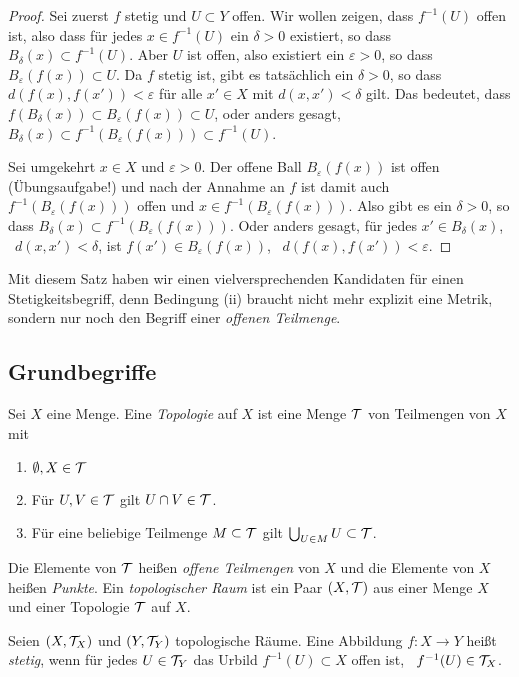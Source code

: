 \begin{proof}
Sei zuerst $f$ stetig und $U\subset Y$ offen. Wir wollen zeigen, dass
$f^{-1}(U)$ offen ist, also dass für jedes $x\in f^{-1}(U)$ ein $\delta>0$
existiert, so dass $B_\delta(x)\subset f^{-1}(U)$. Aber $U$ ist offen, also
existiert ein $\varepsilon>0$, so dass $B_\varepsilon(f(x))\subset U$. Da $f$
stetig ist, gibt es tatsächlich ein $\delta > 0$, so dass $d(f(x),f(x')) <
\varepsilon$ für alle $x'\in X$ mit $d(x,x')<\delta$ gilt. Das bedeutet, dass $f(B_\delta(x))\subset B_\varepsilon(f(x))\subset U$,
oder anders gesagt, $B_\delta(x)\subset f^{-1}(B_\varepsilon(f(x)))\subset
f^{-1}(U)$.

Sei umgekehrt $x\in X$ und $\varepsilon>0$. Der offene Ball
$B_\varepsilon(f(x))$ ist offen (Übungsaufgabe!) und nach der Annahme an $f$ ist
damit auch $f^{-1}(B_\varepsilon(f(x)))$ offen und $x\in
f^{-1}(B_\varepsilon(f(x)))$. Also gibt es ein $\delta>0$, so dass
$B_\delta(x)\subset f^{-1}(B_\varepsilon(f(x)))$. Oder anders gesagt, für jedes
$x'\in B_\delta(x)$, \ddh~$d(x,x')<\delta$, ist $f(x')\in B_\varepsilon(f(x))$,
\ddh~$d(f(x),f(x')) < \varepsilon$.
\end{proof}
Mit diesem Satz haben wir einen vielversprechenden Kandidaten für einen
Stetigkeitsbegriff, denn Bedingung (ii) braucht nicht mehr explizit eine Metrik,
sondern nur noch den Begriff einer \emph{offenen Teilmenge}.
\subsection{Grundbegriffe}
\begin{definition}
Sei $X$ eine Menge. Eine \emph{Topologie} auf $X$ ist eine Menge $\cal T$ von
Teilmengen von $X$ mit
\begin{enumerate}
\item $\emptyset, X\in\cal T$
\item Für $U,V\in\cal T$ gilt $U\cap V\in\cal T$.
\item Für eine beliebige Teilmenge $M\subset\cal T$ gilt $\bigcup_{U\in M}
U\subset \cal T$.
\end{enumerate}
Die Elemente von $\cal T$ heißen \emph{offene Teilmengen} von $X$ und die
Elemente von $X$ heißen \emph{Punkte}. Ein \emph{topologischer Raum} ist ein
Paar $(X,\cal T)$ aus einer Menge $X$ und einer Topologie $\cal T$ auf $X$.
\end{definition}
\begin{definition}
Seien $(X,\cal T_X)$ und $(Y,\cal T_Y)$ topologische Räume. Eine Abbildung
$f\colon X\to Y$ heißt \emph{stetig}, wenn für jedes $U\in\cal T_Y$ das Urbild
$f^{-1}(U)\subset X$ offen ist, \ddh~$f^{-1}(U)\in\cal T_X$.
\end{definition}


